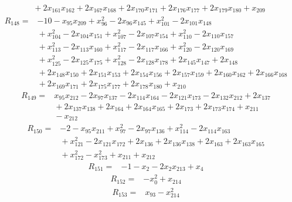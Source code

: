 {\begin{align*}
&{}  + 2x_{161} x_{162} + 2x_{167} x_{168} + 2x_{170} x_{171} + 2x_{176} x_{177} + 2x_{179} x_{180} + x_{209}
\end{align*}
\begin{align*}
R_{148} ={}& -10 - x_{95} x_{209} + x_{96}^{2} - 2x_{96} x_{145} + x_{101}^{2} - 2x_{101} x_{148} \\
&{}  + x_{104}^{2} - 2x_{104} x_{151} + x_{107}^{2} - 2x_{107} x_{154} + x_{110}^{2} - 2x_{110} x_{157} \\
&{}  + x_{113}^{2} - 2x_{113} x_{160} + x_{117}^{2} - 2x_{117} x_{166} + x_{120}^{2} - 2x_{120} x_{169} \\
&{}  + x_{125}^{2} - 2x_{125} x_{175} + x_{128}^{2} - 2x_{128} x_{178} + 2x_{145} x_{147} + 2x_{148} \\
&{}  + 2x_{148} x_{150} + 2x_{151} x_{153} + 2x_{154} x_{156} + 2x_{157} x_{159} + 2x_{160} x_{162} + 2x_{166} x_{168} \\
&{}  + 2x_{169} x_{171} + 2x_{175} x_{177} + 2x_{178} x_{180} + x_{210}
\end{align*}
\begin{align*}
R_{149} ={}& x_{95} x_{212} - 2x_{97} x_{137} - 2x_{114} x_{164} - 2x_{121} x_{173} - 2x_{132} x_{212} + 2x_{137} \\
&{}  + 2x_{137} x_{138} + 2x_{164} + 2x_{164} x_{165} + 2x_{173} + 2x_{173} x_{174} + x_{211} \\
&{}  - x_{212}
\end{align*}
\begin{align*}
R_{150} ={}& -2 - x_{95} x_{211} + x_{97}^{2} - 2x_{97} x_{136} + x_{114}^{2} - 2x_{114} x_{163} \\
&{}  + x_{121}^{2} - 2x_{121} x_{172} + 2x_{136} + 2x_{136} x_{138} + 2x_{163} + 2x_{163} x_{165} \\
&{}  + x_{172}^{2} - x_{173}^{2} + x_{211} + x_{212}
\end{align*}
\begin{align*}
R_{151} ={}& -1 - x_{2} - 2x_{2} x_{213} + x_{4}
\end{align*}
\begin{align*}
R_{152} ={}& -x_{0}^{2} + x_{214}
\end{align*}
\begin{align*}
R_{153} ={}& x_{93} - x_{214}^{2}
\end{align*}
}

